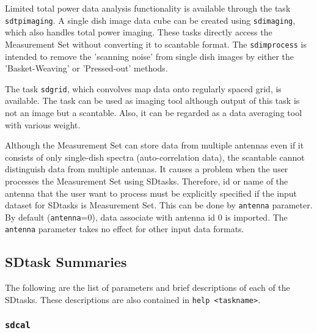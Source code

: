 Limited total power data analysis functionality is available through 
the task {\tt sdtpimaging}. A single dish image data cube can be created
using  {\tt sdimaging}, which also handles total power imaging.
These tasks directly access the Measurement Set without converting it to scantable format.
The {\tt sdimprocess} is intended to remove the 'scanning noise' from single dish
images by either the 'Basket-Weaving' or 'Pressed-out' methods.

The task {\tt sdgrid}, which convolves map data onto regularly 
spaced grid, is available. The task can be used as imaging tool although 
output of this task is not an image but a scantable. Also, it can be 
regarded as a data averaging tool with various weight. 

Although the Measurement Set can store data from multiple antennas
even if it consists of only single-dish spectra (auto-correlation data),
the scantable cannot distinguish data from multiple antennas. It causes
a problem when the user processes the Measurement Set using SDtasks.
Therefore, id or name of the antenna that the user want to process
must be explicitly specified if the input dataset for SDtasks is
Measurement Set. This can be done by {\tt antenna} parameter. By default
({\tt antenna}=0), data associate with antenna id 0 is imported.
The {\tt antenna} parameter takes no effect for other input data formats.

\subsection{SDtask Summaries}
\label{section:sd.sdtasks.tasks}

The following are the list of parameters and
brief descriptions of each of the SDtasks.
These descriptions are also contained in {\tt help <taskname>}.

\subsubsection{{\tt sdcal}}
\label{section:sd.sdtasks.tasks.sdcal}

